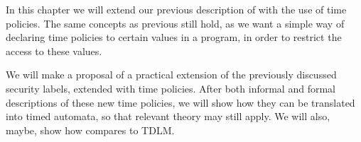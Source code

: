 
In this chapter we will extend our previous description of \thelang{} with the use of time policies.
The same concepts as previous still hold, as we want a simple way of declaring time policies to certain values in a program, in order to restrict the access to these values.

We will make a proposal of a practical extension of the previously discussed security labels, extended with time policies.
After both informal and formal descriptions of these new time policies, we will show how they can be translated into timed automata, so that relevant theory may still apply.
We will also, maybe, show how \thelang{} compares to TDLM.
